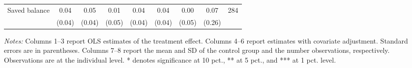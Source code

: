 \begin{table}[h]
{\begin{threeparttable}
\begin{tabular}{l*{8}{c}}
Saved balance&     0.04&     0.05&     0.01&     0.04&     0.04&     0.00&     0.07&      284\\
          &   (0.04)&   (0.04)&   (0.05)&   (0.04)&   (0.04)&   (0.05)&   (0.26)&         \\
\bottomrule \end{tabular} \begin{tablenotes}[flushleft] \footnotesize \item \emph{Notes:} Columns 1--3 report OLS estimates of the treatment effect. Columns 4--6 report estimates with covariate adjustment. Standard errors are in parentheses. Columns 7--8 report the mean and SD of the control group and the number observations, respectively. Observations are at the individual level. * denotes significance at 10 pct., ** at 5 pct., and *** at 1 pct. level. \end{tablenotes} \end{threeparttable} } \end{table}

